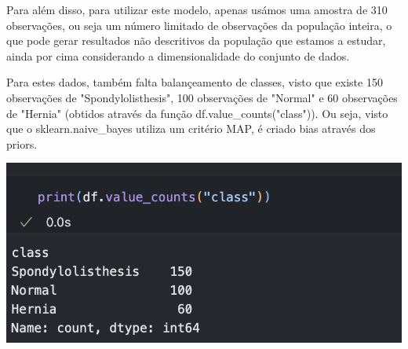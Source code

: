 \documentclass[12pt]{article}
\begin{document}
\begin{enumerate}[leftmargin=\labelsep]
    Para além disso, para utilizar este modelo, apenas usámos uma amostra de 310 observações, ou seja um número limitado de observações da população inteira, o que pode gerar resultados não descritivos da população que estamos a estudar, ainda por cima considerando a dimensionalidade do conjunto de dados.

    Para estes dados, também falta balançeamento de classes, visto que existe 150 observações de "Spondylolisthesis", 100 observações de "Normal" e 60 observações de "Hernia" (obtidos através da função df.value\_counts("class")). Ou seja, visto que o sklearn.naive\_bayes utiliza um critério MAP, é criado bias através dos priors.

    \begin{center}
        \includegraphics[scale=0.6]{images/code8.png}
    \end{center}
\end{enumerate}
\end{document}
